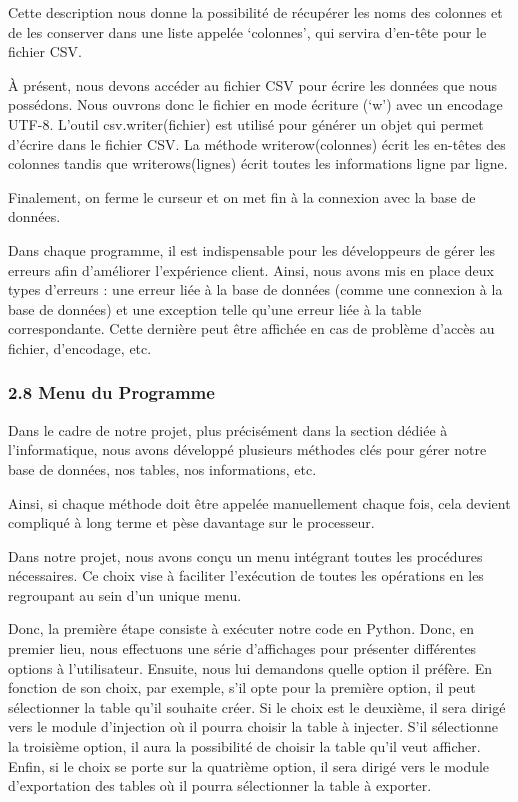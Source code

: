 \documentclass[
]{article}
\begin{document}
Cette description nous donne la possibilité de récupérer les noms des
colonnes et de les conserver dans une liste appelée `colonnes', qui
servira d'en-tête pour le fichier CSV.

À présent, nous devons accéder au fichier CSV pour écrire les données
que nous possédons. Nous ouvrons donc le fichier en mode écriture (`w')
avec un encodage UTF-8. L'outil csv.writer(fichier) est utilisé pour
générer un objet qui permet d'écrire dans le fichier CSV. La méthode
writerow(colonnes) écrit les en-têtes des colonnes tandis que
writerows(lignes) écrit toutes les informations ligne par ligne.

Finalement, on ferme le curseur et on met fin à la connexion avec la
base de données.

Dans chaque programme, il est indispensable pour les développeurs de
gérer les erreurs afin d'améliorer l'expérience client. Ainsi, nous
avons mis en place deux types d'erreurs : une erreur liée à la base de
données (comme une connexion à la base de données) et une exception
telle qu'une erreur liée à la table correspondante. Cette dernière peut
être affichée en cas de problème d'accès au fichier, d'encodage, etc.

\subsubsection{2.8 Menu du Programme}\label{menu-du-programme}

Dans le cadre de notre projet, plus précisément dans la section dédiée à
l'informatique, nous avons développé plusieurs méthodes clés pour gérer
notre base de données, nos tables, nos informations, etc.

Ainsi, si chaque méthode doit être appelée manuellement chaque fois,
cela devient compliqué à long terme et pèse davantage sur le processeur.

Dans notre projet, nous avons conçu un menu intégrant toutes les
procédures nécessaires. Ce choix vise à faciliter l'exécution de toutes
les opérations en les regroupant au sein d'un unique menu.

Donc, la première étape consiste à exécuter notre code en Python. Donc,
en premier lieu, nous effectuons une série d'affichages pour présenter
différentes options à l'utilisateur. Ensuite, nous lui demandons quelle
option il préfère. En fonction de son choix, par exemple, s'il opte pour
la première option, il peut sélectionner la table qu'il souhaite créer.
Si le choix est le deuxième, il sera dirigé vers le module d'injection
où il pourra choisir la table à injecter. S'il sélectionne la troisième
option, il aura la possibilité de choisir la table qu'il veut afficher.
Enfin, si le choix se porte sur la quatrième option, il sera dirigé vers
le module d'exportation des tables où il pourra sélectionner la table à
exporter.
\end{document}
